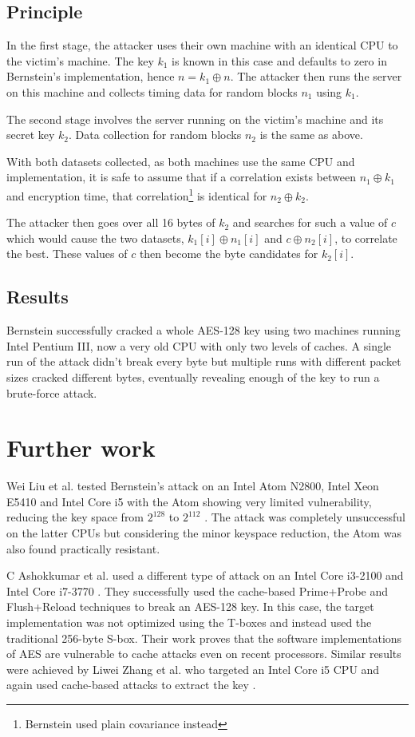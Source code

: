 \documentclass[thesis=B,english]{FITthesis}[2019/03/06]
\begin{document}
\subsection{Principle}
\label{section:bernstein_impl}
In the first stage, the attacker uses their own machine with an identical CPU to the victim's machine.
The key $k_1$ is known in this case and defaults to zero in Bernstein's implementation, hence $n = k_1 \oplus n$.
The attacker then runs the server on this machine and collects timing data for random blocks $n_1$ using $k_1$.

The second stage involves the server running on the victim's machine and its secret key $k_2$. Data collection for random blocks $n_2$ is the same as above.

With both datasets collected, as both machines use the same CPU and implementation, it is safe to assume that if a correlation exists between $n_1 \oplus k_1$ and encryption time,
that correlation\footnote{Bernstein used plain covariance instead} is identical for $n_2 \oplus k_2$.

The attacker then goes over all 16 bytes of $k_2$ and searches for such a value of $c$ which would cause the two datasets, $k_1[i] \oplus n_1[i]$ and $c \oplus n_2[i]$, to correlate the best.
These values of $c$ then become the byte candidates for $k_2[i]$.

\subsection{Results}
Bernstein successfully cracked a whole AES-128 key using two machines running Intel Pentium III, now a very old CPU with only two levels of caches.
A single run of the attack didn't break every byte but multiple runs with different packet sizes cracked different bytes, eventually revealing enough of the key to run a brute-force attack.

\section{Further work}
Wei Liu et al. tested Bernstein's attack on an Intel Atom N2800, Intel Xeon E5410 and Intel Core i5 with the Atom showing very limited vulnerability,
reducing the key space from $2^{128}$ to $2^{112}$ \cite{WEI}.
The attack was completely unsuccessful on the latter CPUs but considering the minor keyspace reduction, the Atom was also found practically resistant.

C Ashokkumar et al. used a different type of attack on an Intel Core i3-2100 and Intel Core i7-3770 \cite{ASHOKKUMAR}.
They successfully used the cache-based Prime+Probe and Flush+Reload techniques to break an AES-128 key.
In this case, the target implementation was not optimized using the T-boxes and instead used the traditional 256-byte S-box.
Their work proves that the software implementations of AES are vulnerable to cache attacks even on recent processors.
Similar results were achieved by Liwei Zhang et al. who targeted an Intel Core i5 CPU and again used cache-based attacks to extract the key \cite{ZHANG}.
\end{document}
